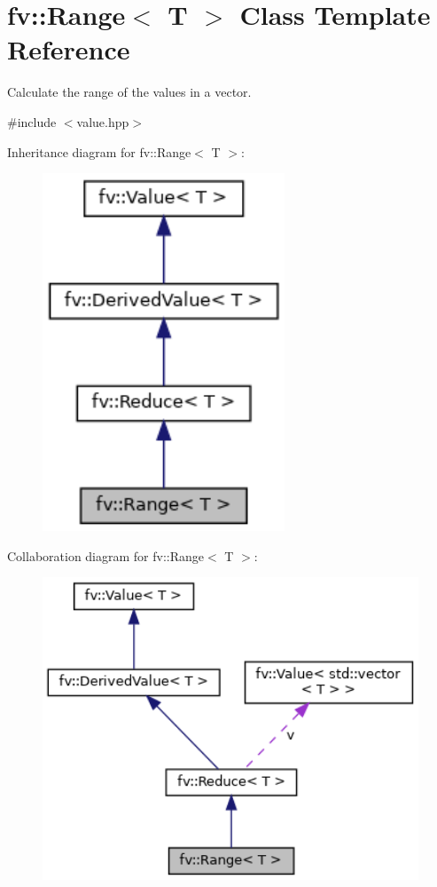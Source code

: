 \hypertarget{classfv_1_1Range}{}\section{fv\+:\+:Range$<$ T $>$ Class Template Reference}
\label{classfv_1_1Range}


Calculate the range of the values in a vector.  




{\ttfamily \#include $<$value.\+hpp$>$}



Inheritance diagram for fv\+:\+:Range$<$ T $>$\+:
\nopagebreak
\begin{figure}[H]
\begin{center}
\leavevmode
\includegraphics[width=205pt]{classfv_1_1Range__inherit__graph}
\end{center}
\end{figure}


Collaboration diagram for fv\+:\+:Range$<$ T $>$\+:
\nopagebreak
\begin{figure}[H]
\begin{center}
\leavevmode
\includegraphics[width=350pt]{classfv_1_1Range__coll__graph}
\end{center}
\end{figure}

